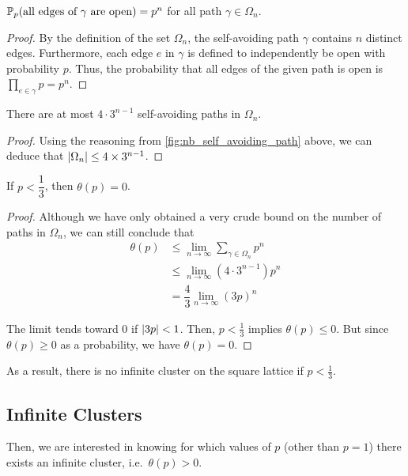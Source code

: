 \documentclass[a4paper, 12pt]{article}
\begin{document}
\begin{prop}\label{prop:p_path_all_open}
$\P(\text{all edges of } \gamma \text{ are open}) = p^n$ for all path $\gamma \in \Omega_n$.
\end{prop}
\begin{proof}
By the definition of the set $\Omega_n$, the self-avoiding path $\gamma$ contains $n$ distinct edges. Furthermore, each edge $e$ in $\gamma$ is defined to independently be open with probability $p$. Thus, the probability that all edges of the given path is open is $\prod_{e \in \gamma} p = p^n$.
\end{proof}

\begin{prop}\label{prop:nb_paths_len_n}
There are at most $4 \cdot 3^{n - 1}$ self-avoiding paths in $\Omega_n$.
\end{prop}
\begin{proof}

Using the reasoning from \cref{fig:nb_self_avoiding_path} above, we can deduce that $\abs{\Omega_n} \leq 4 \times 3^{n - 1}$.
\end{proof}

\begin{thm}\label{thm:pc_lower_bound}
If $p < \dfrac{1}{3}$, then $\theta(p) = 0$.
\end{thm}
\begin{proof}
Although we have only obtained a very crude bound on the number of paths in $\Omega_n$, we can still conclude that
\begin{align*}
    \theta(p)
    &\leq \lim_{n \to \infty} \sum_{\gamma \in \Omega_n} p^n\\
    &\leq \lim_{n \to \infty} \left(4 \cdot 3^{n - 1}\right) p^n\\
    &= \dfrac{4}{3} \lim_{n \to \infty} (3p)^n
\end{align*}

The limit tends toward 0 if $\abs{3p} < 1$. Then, $p < \frac{1}{3}$ implies $\theta(p) \leq 0$. But since $\theta(p) \geq 0$ as a probability, we have $\theta(p) = 0$.
\end{proof}

As a result, there is no infinite cluster on the square lattice if $p < \frac{1}{3}$.

\subsection{Infinite Clusters}\label{subsec:inf_cluster}
Then, we are interested in knowing for which values of $p$ (other than $p = 1$) there exists an infinite cluster, i.e.\ $\theta(p) > 0$.
\end{document}
